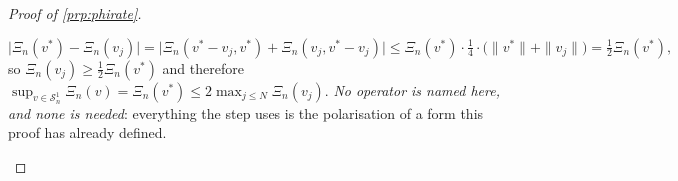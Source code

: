 \begin{proof}[Proof of \cref{prp:phirate}]
\begin{itemize}
\[
\big|\varXi_n(v^\ast)-\varXi_n(v_j)\big|
=\big|\varXi_n(v^\ast-v_j,v^\ast)+\varXi_n(v_j,v^\ast-v_j)\big|
\le\varXi_n(v^\ast)\cdot\tfrac14\cdot\big(\|v^\ast\|+\|v_j\|\big)
=\tfrac12\varXi_n(v^\ast) ,
\]
so $\varXi_n(v_j)\ge\tfrac12\varXi_n(v^\ast)$ and therefore
$\sup_{v\in\mathcal S^{1}_n}\varXi_n(v)=\varXi_n(v^\ast)\le2\max_{j\le N}\varXi_n(v_j)$.
\emph{No operator is named here, and none is needed}: everything the step uses is the polarisation of a
form this proof has already defined.

\end{itemize}
\end{proof}
